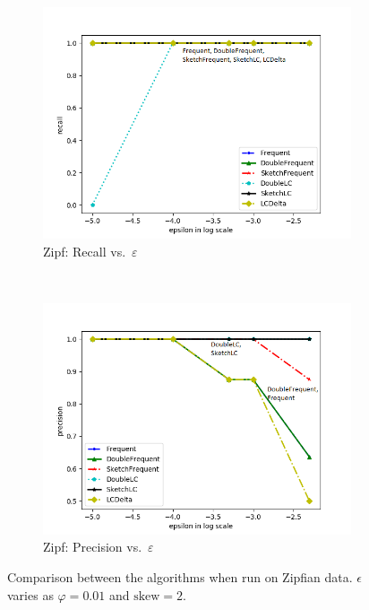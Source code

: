 \documentclass[sigconf,review=true,anonymous=true,screen]{acmart}
\newcommand{\eps}{\varepsilon}
\renewcommand{\phi}{\varphi}
\begin{document}
\begin{figure}[!h]
\begin{subfigure}[b]{0.3\textwidth}
\includegraphics[width=\textwidth]{../Plots/recall_epsilonskew.png}
\caption{Zipf: Recall vs.~$\eps$}
\label{fig:zipreceps}
\end{subfigure}
~
\begin{subfigure}[b]{0.3\textwidth}
\includegraphics[width=\textwidth]{../Plots/precision_epsilonskew.png}
\caption{Zipf: Precision vs.~$\eps$}
\label{fig:zippreeps}
\end{subfigure}
\caption{Comparison between the algorithms when run on Zipfian data. $\epsilon$ varies as $\phi = 0.01$ and $\text{skew} = 2$.}
\label{fig:varyeps}
\end{figure}
\end{document}

